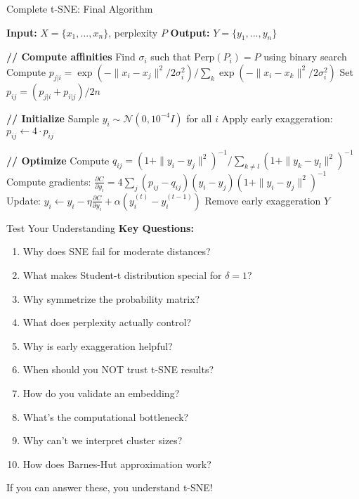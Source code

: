 \begin{frame}{Complete t-SNE: Final Algorithm}
\small
\begin{algorithmic}[1]
\State \textbf{Input:} $X = \{x_1, ..., x_n\}$, perplexity $P$
\State \textbf{Output:} $Y = \{y_1, ..., y_n\}$

\State \textbf{// Compute affinities}
    \State Find $\sigma_i$ such that $\text{Perp}(P_i) = P$ using binary search
    \State Compute $p_{j|i} = \exp(-\|x_i - x_j\|^2/2\sigma_i^2) / \sum_k \exp(-\|x_i - x_k\|^2/2\sigma_i^2)$
\EndFor
\State Set $p_{ij} = (p_{j|i} + p_{i|j})/2n$

\State \textbf{// Initialize}
\State Sample $y_i \sim \mathcal{N}(0, 10^{-4}I)$ for all $i$
\State Apply early exaggeration: $p_{ij} \leftarrow 4 \cdot p_{ij}$

\State \textbf{// Optimize}
    \State Compute $q_{ij} = (1 + \|y_i - y_j\|^2)^{-1} / \sum_{k \neq l}(1 + \|y_k - y_l\|^2)^{-1}$
    \State Compute gradients: $\frac{\partial C}{\partial y_i} = 4\sum_j (p_{ij} - q_{ij})(y_i - y_j)(1 + \|y_i - y_j\|^2)^{-1}$
    \State Update: $y_i \leftarrow y_i - \eta\frac{\partial C}{\partial y_i} + \alpha(y_i^{(t)} - y_i^{(t-1)})$
     Remove early exaggeration \EndIf
\EndFor
\State \Return $Y$
\end{algorithmic}
\end{frame}

\begin{frame}{Test Your Understanding}
\textbf{Key Questions:}

\begin{enumerate}
\item Why does SNE fail for moderate distances?
\item What makes Student-t distribution special for $\delta = 1$?
\item Why symmetrize the probability matrix?
\item What does perplexity actually control?
\item Why is early exaggeration helpful?
\item When should you NOT trust t-SNE results?
\item How do you validate an embedding?
\item What's the computational bottleneck?
  \item Why can't we interpret cluster sizes?
\item How does Barnes-Hut approximation work?
\end{enumerate}

\vspace{0.3cm}
\begin{center}
\colorbox{yellow!30}{If you can answer these, you understand t-SNE!}
\end{center}
\end{frame}

